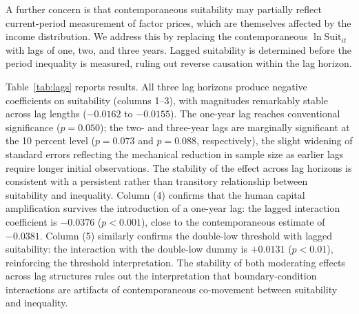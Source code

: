 \documentclass[12pt]{article}
\newcommand{\suit}{\mathrm{Suit}}
\begin{document}
A further concern is that contemporaneous suitability may partially
reflect current-period measurement of factor prices, which are
themselves affected by the income distribution.
We address this by replacing the contemporaneous $\ln\suit_{it}$
with lags of one, two, and three years.
Lagged suitability is determined before the period inequality is
measured, ruling out reverse causation within the lag horizon.

Table~\ref{tab:lags} reports results.
All three lag horizons produce negative coefficients on suitability
(columns 1--3), with magnitudes remarkably stable across lag
lengths ($-0.0162$ to $-0.0155$).
The one-year lag reaches conventional significance ($p = 0.050$);
the two- and three-year lags are marginally significant at the
10 percent level ($p = 0.073$ and $p = 0.088$, respectively),
the slight widening of standard errors reflecting the mechanical
reduction in sample size as earlier lags require longer initial
observations.
The stability of the effect across lag horizons is consistent with
a persistent rather than transitory relationship between suitability
and inequality.
Column (4) confirms that the human capital amplification survives
the introduction of a one-year lag: the lagged interaction
coefficient is $-0.0376$ ($p < 0.001$), close to the
contemporaneous estimate of $-0.0381$.
Column (5) similarly confirms the double-low threshold with lagged
suitability: the interaction with the double-low dummy is $+0.0131$
($p < 0.01$), reinforcing the threshold interpretation.
The stability of both moderating effects across lag structures
rules out the interpretation that boundary-condition interactions
are artifacts of contemporaneous co-movement between suitability
and inequality.
\end{document}

